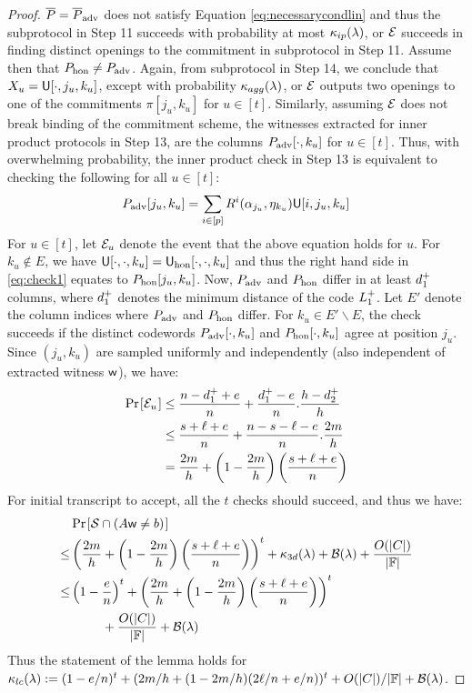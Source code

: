 \begin{proof}
$\overline{P}=\overline{P}_{\rm adv}$ does not satisfy Equation
\eqref{eq:necessarycondlin} and thus the subprotocol in Step 11 succeeds with
probability at most $\kappa_{ip}(\lambda)$, or $\mathcal{E}$ succeeds in finding
distinct openings to the commitment in subprotocol in Step 11. Assume then that $P_{\rm hon}\neq
P_{\rm adv}$. Again, from subprotocol in Step 14, we conclude that $X_u =
\mathsf{U}[\cdot,j_u,k_u]$, except with probability $\kappa_{agg}(\lambda)$, or
$\mathcal{E}$ outputs two openings to one of the commitments $\pi[j_u,k_u]$ for $u\in
[t]$. Similarly, assuming $\mathcal{E}$ does not break binding of the commitment
scheme, the witnesses extracted for inner product protocols in Step 13, are the
columns $P_{\rm adv}[\cdot,k_u]$ for $u\in [t]$. Thus, with overwhelming probability, the inner product check in Step 13 is
equivalent to checking the following for all $u\in [t]$:
\begin{equation}\label{eq:check1}
P_{\rm adv}[j_u,k_u]=\sum_{i\in
[p]}R^i(\alpha_{j_u},\eta_{k_u})\ewit[i,j_u,k_u]
\end{equation}
For $u\in [t]$, let $\mathcal{E}_u$ denote the event that the above equation holds
for $u$. For $k_u\not\in E$, we have $\mathsf{U}[\cdot,\cdot,k_u]=\mathsf{U}_{\rm
hon}[\cdot,\cdot,k_u]$ and thus the right hand side in \eqref{eq:check1} equates
to $P_{\rm hon}[j_u,k_u]$. Now, $P_{\rm adv}$ and $P_{\rm hon}$ differ in at
least $d^{+}_1$ columns, where $d^{+}_1$ denotes the minimum distance of the
code $L^{+}_1$. Let $E'$ denote the column indices where $P_{\rm adv}$ and
$P_{\rm hon}$ differ. For $k_u\in E'\backslash E$, the check succeeds if the
distinct codewords $P_{\rm adv}[\cdot,k_u]$ and $P_{\rm hon}[\cdot,k_u]$ agree
at position $j_u$. Since $(j_u,k_u)$ are sampled uniformly and independently
(also independent of extracted witness $\mathsf{w}$), we have:
{\small
\begin{align}\label{eq:probeq6}
\prob{\mc{E}_u} &\leq \frac{n-\dashD_1+e}{n} +
\frac{\dashD_1-e}{n}.\frac{h-\dashD_2}{h}
\nonumber \\
	&\leq \frac{s+\ell+e}{n} + \frac{n-s-\ell-e}{n}.\frac{2m}{h} \nonumber \\
	& = \frac{2m}{h} +
\left(1-\frac{2m}{h}\right)\left(\frac{s+\ell+e}{n}\right)
\end{align}
}
For initial transcript to accept, all the $t$ checks should succeed, and thus we
have:
{\small
\begin{align}\label{eq:probeq7}
&\prob{\mc{S}\cap (A\wit\neq b)}\\
\leq&
\left(\frac{2m}{h}+\left(1-\frac{2m}{h}\right)\left(\frac{s+\ell+e}{n}\right)\right)^t
+ \kappa_{3d}(\secpar) + \mc{B}(\secpar) +
\frac{O(|C|)}{|\FF|} \nonumber \\
\leq& \left(1-\frac{e}{n}\right)^t +
\left(\frac{2m}{h}+\left(1-\frac{2m}{h}\right)\left(\frac{s+\ell+e}{n}\right)\right)^t
\\
& \qquad \, \, \,+ \frac{O(|C|)}{|\FF|} + \mc{B}(\secpar)
\end{align}
}
Thus the statement of the lemma holds for $\kappa_{lc}(\lambda) := (1-e/n)^t +
(2m/h + (1-2m/h)(2\ell/n + e/n))^t+O(|C|)/|\mathbb{F}|+\mathcal{B}(\lambda)$.
\end{proof}


